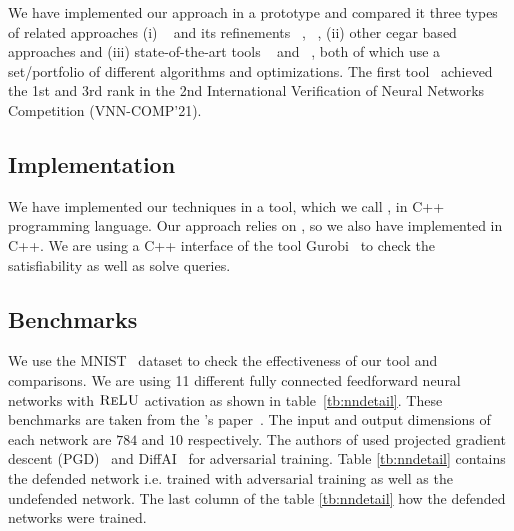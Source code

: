 We have implemented our approach in a prototype and compared it three types of related approaches (i) \deeppoly{}~\cite{singh2019abstract} and its refinements \kpoly{}~\cite{singh2019beyond}, \deepsrgr{}~\cite{yang2021improving}, (ii) other cegar based approaches and 
(iii) state-of-the-art tools \alphabeta~\cite{zhang2018efficient,wang2021beta,xu2020fast,zhang2022branch,tjeng2017evaluating} and 
\ovaltool~\cite{bunel2018unified,bunel2020branch,bunel2020lagrangian,de2021scaling,de2021scaling,de2021scaling2,de2021improved}, both of which use a set/portfolio of different algorithms and optimizations. The first tool~\alphabeta{} achieved the 1st and \ovaltool{} 3rd rank in the 2nd International Verification of Neural Networks Competition (VNN-COMP'21).
\subsection{Implementation}
We have implemented our techniques in a tool, which we call \drefine{}, in \textsc{C++} programming language. Our approach relies on \deeppoly{}, so we also have implemented \deeppoly{} in \textsc{C++}. We are using a \textsc{C++} interface of the tool Gurobi~\cite{gurobioptimizer} to check the satisfiability as well as solve  \maxsat{} queries. %

\subsection{Benchmarks}
We use the MNIST~\cite{deng2012mnist} dataset to check the effectiveness of our tool and comparisons. We are using 11 different fully connected feedforward neural networks with $\textsc{ReLU}${} activation as shown in table~\ref{tb:nndetail}.
These benchmarks are taken from the \deeppoly{}'s paper~\cite{singh2019abstract}.  The input and output dimensions of each network are $784$ and $10$ respectively. 
The authors of \deeppoly{} used projected gradient descent (PGD)~\cite{dong2018boosting}
and DiffAI~\cite{mirman2018differentiable} for adversarial training. Table \ref{tb:nndetail} contains the defended network i.e.
trained with adversarial training as well as the undefended network. The last column of the table \ref{tb:nndetail} how the defended networks were trained.  

